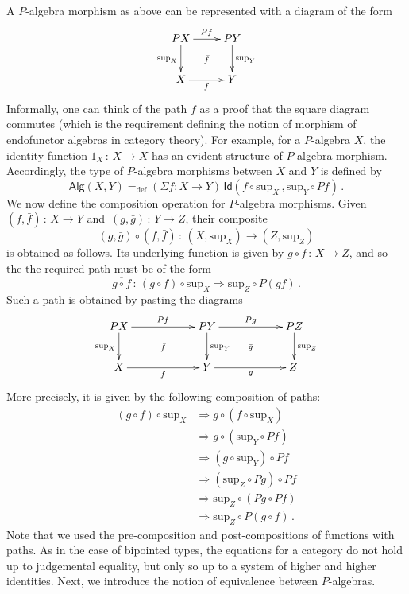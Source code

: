 \documentclass[10pt,a4paper,oneside,reqno]{amsart}
\theoremstyle{mythm}
\theoremstyle{mydef}
\theoremstyle{myrmk}
\newcommand{\defeq}{=_{\mathrm{def}}}
\newcommand{\co}{\,{:}\,}
\newcommand{\Id}{\mathsf{Id}}
\newcommand{\Palg}{\mathsf{Alg}}
\renewcommand{\sup}{\mathrm{sup}}
\begin{document}
A $P$-algebra morphism as above can be represented with a diagram of the form
\[
\xymatrix{
 PX \ar[d]_{\sup_X} \ar[r]^{Pf}  \ar@{}[dr]|{\bar{f}} &  PY \ar[d]^{\sup_Y}\\
X \ar[r]_{f}   & Y }
\] 
Informally, one can think of the path $\bar{f}$ as a proof that the square diagram commutes (which is the 
requirement defining the notion of morphism of endofunctor algebras in category theory). For example, for a $P$-algebra $X$, 
the identity function $1_X \co X \to X$ has an evident structure of $P$-algebra morphism. Accordingly, the type of $P$-algebra 
morphisms between $X$ and $Y$ is defined by
\[
\Palg(X,Y)
 \defeq  
(\Sigma f:  X \rightarrow Y) \, \Id(f\circ \sup_X \, ,  \sup_Y \circ P f )  \, .
\]
We now define the composition operation for $P$-algebra morphisms. Given $(f, \bar{f}) \co X \to Y$ and~$(g, \bar{g}) \co Y \to Z$,
their composite 
\[
(g, \bar{g}) \circ (f, \bar{f}) \co (X, \sup_X) \to (Z, \sup_Z)
\] 
is obtained as follows. Its underlying function is given by $g\circ f\co X \to Z$, and so the 
the required path must be of the form
\[
 \overline{ g \circ f} \co (g\circ f) \circ \sup_X \Rightarrow \sup_Z \circ P(gf)\, .
\]
Such a path is obtained by pasting the diagrams 
\[
\xymatrix@C=2cm{
 PX \ar[d]_{\sup_X} \ar[r]^{Pf}  \ar@{}[dr]|{\bar{f}} &  PY \ar[d]^{\sup_Y}  \ar[r]^{Pg}  \ar@{}[dr]|{\bar{g}} &  PZ \ar[d]^{\sup_Z} \\
X \ar[r]_{f}   & Y \ar[r]_{g}   & Z \,  }
\]
More precisely, it is given by the following composition of paths:
\begin{align*}
(g\circ f) \circ \sup_X &  \Rightarrow g \circ (f \circ \sup_X) \\
 & \Rightarrow g \circ ( \sup_Y \circ P f ) \\
 & \Rightarrow (g \circ \sup_Y) \circ Pf \\
 & \Rightarrow (\sup_Z \circ Pg) \circ Pf \\
 & \Rightarrow \sup_Z \circ (Pg \circ Pf) \\
 & \Rightarrow \sup_Z \circ P (g\circ f) \, .
 \end{align*}
Note that we used the pre-composition and post-compositions of functions with paths. As in the case of bipointed types, the equations for a category do not hold up to judgemental equality, but only so up to a system of higher and higher identities. Next, we introduce the notion of equivalence between $P$-algebras.

\medskip
\end{document}
